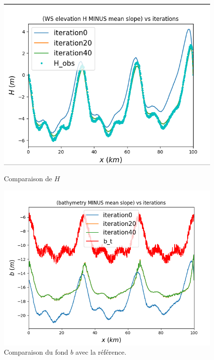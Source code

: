 \documentclass{article}
\begin{document}
\begin{figure}[H]

    \begin{minipage}[b]{0.45\linewidth}
        \centering
        \includegraphics[width=\linewidth]{Images_Ayoub/With_Regularisation/Alpha_Const/Graphs/H_Comparaison.png}
        \caption{Comparaison de $H$}
        \label{fig:wr-rmse}
    \end{minipage}
    \hfill
    \begin{minipage}[b]{0.45\linewidth}
        \centering
        \includegraphics[width=\linewidth]{Images_Ayoub/With_Regularisation/Alpha_Const/Graphs/b_Comparaison.png}
        \caption{Comparaison du fond \(b\) avec la référence.}
        \label{fig:wr-b-comparaison}
    \end{minipage}


\end{figure}
\end{document}

